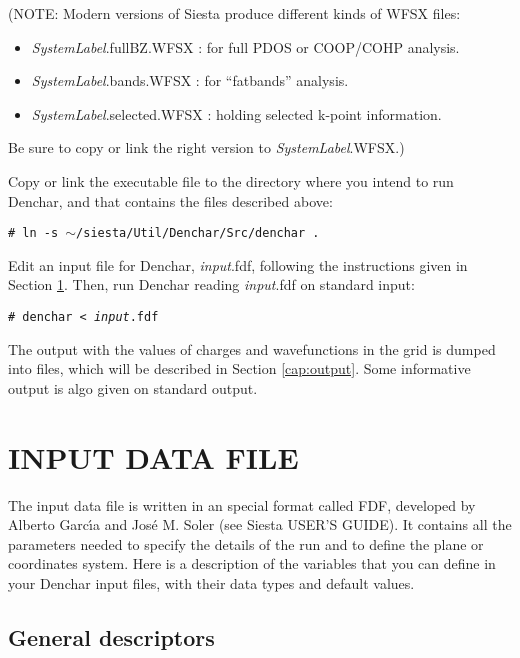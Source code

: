(NOTE: Modern versions of {\sc Siesta} produce different kinds
of WFSX files: 
\begin{itemize}
\item {\it SystemLabel}.fullBZ.WFSX : for full PDOS or COOP/COHP
  analysis.
\item {\it SystemLabel}.bands.WFSX : for ``fatbands'' analysis.
\item {\it SystemLabel}.selected.WFSX : holding selected k-point information.
\end{itemize}
Be sure to copy or link the right version to  {\it SystemLabel}.WFSX.)

 Copy or link the executable file to the directory
 where you intend to run  {\sc Denchar}, and that
 contains the files described above:

 {\tt \# ln -s $\sim$/siesta/Util/Denchar/Src/denchar . }

 Edit an input file for {\sc Denchar}, {\it input}.fdf, following the 
 instructions given in Section \ref{cap:input}. Then,
 run  {\sc Denchar} reading {\it input}.fdf on
 standard input:


 {\tt \# denchar < {\it input}.fdf } 


 The output with the values of charges and wavefunctions
 in the grid is dumped into files, which will be described
 in Section \ref{cap:output}. Some informative output is
 algo given on standard output.

\section{INPUT DATA FILE}
\label{cap:input} 

The input data file is written in an special format called FDF, developed
by Alberto Garc\'{\i}a and Jos\'e M. Soler (see {\sc Siesta} USER'S GUIDE).
It contains all the parameters needed to specify the details
of the run and to define the plane or coordinates system.
Here is a description of the variables that you can define in your 
{\sc Denchar} input files,
with their data types and default values.

\vspace{5pt}
\subsection{General descriptors}

